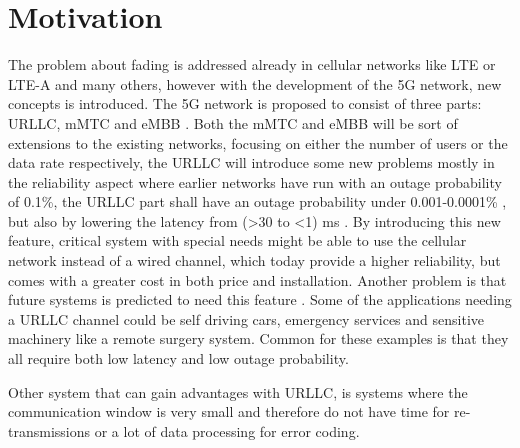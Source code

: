 \section{Motivation}

The problem about fading is addressed already in cellular networks like \gls{LTE} or \gls{LTE-A} and many others, however with the development of the 5G network, new concepts is introduced. The 5G network is proposed to consist of three parts: \Gls{URLLC}, \gls{mMTC} and \gls{eMBB} \citep{5G}. Both the \gls{mMTC} and \gls{eMBB} will be sort of extensions to the existing networks, focusing on either the number of users or the data rate respectively, the \gls{URLLC} will introduce some new problems mostly in the reliability aspect where earlier networks have run with an outage probability of 0.1\%, the URLLC part shall have an outage probability under 0.001-0.0001\% \citep{LTE,Petar5G}, but also by lowering the latency from (>30 to <1) ms \citep{LTE,5G_Latency}. By introducing this new feature, critical system with special needs might be able to use the cellular network instead of a wired channel, which today provide a higher reliability, but comes with a greater cost in both price and installation. Another problem is that future systems is predicted to need this feature \citep{Petar5G}. %
Some of the applications needing a URLLC channel could be self driving cars, emergency services and sensitive machinery like a remote surgery system. Common for these examples is that they all require both low latency and low outage probability.

Other system that can gain advantages with URLLC, is systems where the communication window is very small and therefore do not have time for re-transmissions or a lot of data processing for error coding.


